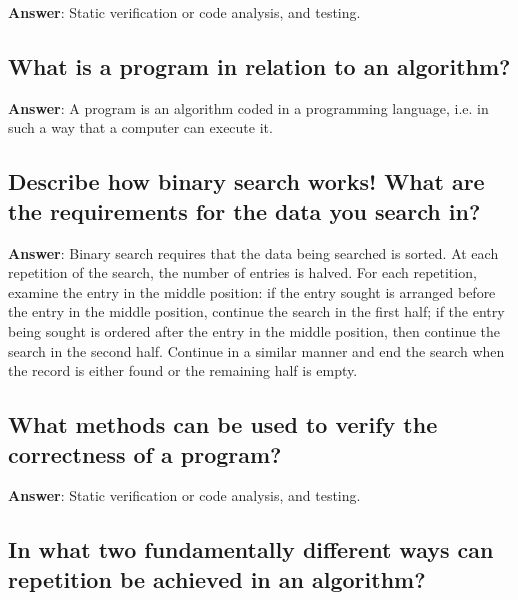 \documentclass[a4paper,11pt,oneside]{article}
\begin{document}
\begin{sloppypar}
\label{q:178:sa:en:True}

\textbf{Answer}: Static verification or code analysis, and testing.



\subsection{What is a program in relation to an algorithm?}

\label{q:179:sa:en:True}

\textbf{Answer}: A program is an algorithm coded in a programming language, i.e. in such a way that a computer can execute it.



\subsection{Describe how binary search works! What are the requirements for the data you search in?}

\label{q:180:sa:en:True}

\textbf{Answer}: Binary search requires that the data being searched is sorted. At each repetition of the search, the number of entries is halved. For each repetition, examine the entry in the middle position: if the entry sought is arranged before the entry in the middle position, continue the search in the first half; if the entry being sought is ordered after the entry in the middle position, then continue the search in the second half. Continue in a similar manner and end the search when the record is either found or the remaining half is empty.



\subsection{What methods can be used to verify the correctness of a program?}

\label{q:181:sa:en:True}

\textbf{Answer}: Static verification or code analysis, and testing.



\subsection{In what two fundamentally different ways can repetition be achieved in an algorithm?}

\label{q:182:sa:en:True}


\end{sloppypar}
\end{document}
